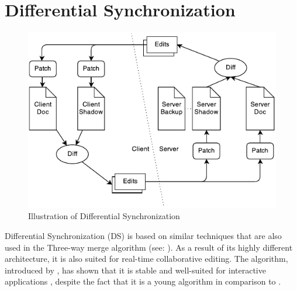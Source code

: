 \section{Differential Synchronization}
\label{sync-diffsync}

\begin{figure}[htb]
  \centerline{\includegraphics[width=0.8\linewidth]{images/Differential_Synchronization.pdf}}
  \caption[Illustration of Differential Synchronization - based upon
  \protect{}
  \protect{}]{Illustration of Differential Synchronization}
  \label{fig:DiffSync}
\end{figure}

Differential Synchronization (DS) is based on similar techniques that are also used in the Three-way merge algorithm (see: ). As a result of its highly different architecture, it is also suited for real-time collaborative editing. The algorithm, introduced by \cite{fraser2009differential},  has shown that it is stable and well-suited for interactive applications \cite[p. 8]{koren2013sharedediting}, despite the fact that it is a young algorithm in comparison to .

